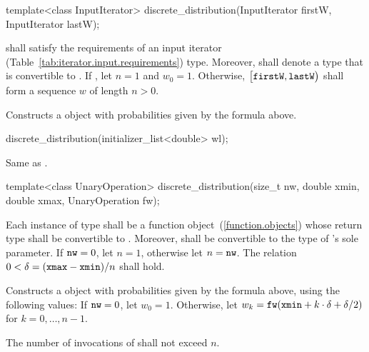 %
\begin{itemdecl}
template<class InputIterator>
  discrete_distribution(InputIterator firstW, InputIterator lastW);
\end{itemdecl}

\begin{itemdescr}
\pnum\requires
   shall satisfy the requirements
  of an input iterator (Table~\ref{tab:iterator.input.requirements}) type.
  Moreover,
  shall denote a type that is convertible to .
 If ,
 let $ n = 1 $
 and $ w_0 = 1 $.
 Otherwise,
 $\bigl[\texttt{firstW}, \texttt{lastW}\bigr)$
 shall form a sequence $w$ of length $n > 0$.

\pnum\effects Constructs a  object
 with probabilities given by the formula above.
\end{itemdescr}


%
\begin{itemdecl}
discrete_distribution(initializer_list<double> wl);
\end{itemdecl}

\begin{itemdescr}
\pnum\effects
 Same as .
\end{itemdescr}

\begin{itemdecl}
template<class UnaryOperation>
  discrete_distribution(size_t nw, double xmin, double xmax, UnaryOperation fw);
\end{itemdecl}

\begin{itemdescr}
\pnum\requires
 Each instance of type 
 shall be a function object~(\ref{function.objects})
 whose return type shall be convertible to .
 Moreover,
  shall be convertible
 to the type of 's sole parameter.
 If $ \texttt{nw} = 0 $, let $ n = 1 $, otherwise let $n = \texttt{nw}$.
 The relation
   $ 0 < \delta = (\texttt{xmax} - \texttt{xmin}) / n $
 shall hold.

\pnum\effects Constructs a  object
 with probabilities given by the formula above,
 using the following values:
 If $\texttt{nw} = 0$,
 let $ w_0 = 1 $.
 Otherwise,
 let $ w_k = \texttt{fw}(\texttt{xmin} + k \cdot \delta + \delta / 2) $
 for $ k = 0, \ldots, n\!-\!1 $.

\pnum\complexity
 The number of invocations of  shall not exceed $n$.
\end{itemdescr}

